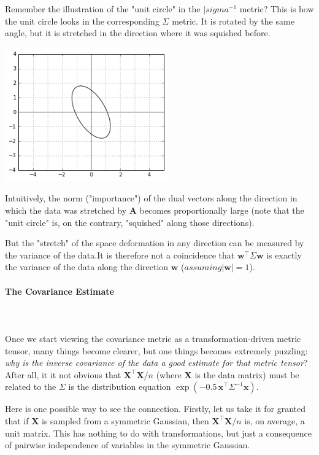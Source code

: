 \documentclass{article}
\begin{document}
Remember the illustration of the "unit circle" in the $|sigma^{-1}$ metric? This is how the unit circle looks in the corresponding $\Sigma$ metric. It is rotated by the same angle, but it is stretched in the direction where it was squished before.

\begin{center}
\includegraphics[width=7cm]{figs_hints_9.png}
\end{center}

Intuitively, the norm ("importance") of the dual vectors along the direction in which the data was stretched by $\bm{A}$ becomes proportionally large (note that the "unit circle" is, on the contrary, "squished" along those directions).\medskip

But the "stretch" of the space deformation in any direction can be measured by the variance of the data.It is therefore not a coincidence that $\bm{w}^{\intercal}\Sigma\bm{w}$ is exactly the variance of the data along the direction $\bm{w}$ ($assuming |\bm{w}| = 1$).

\paragraph{The Covariance Estimate}\mbox{}\\\\
Once we start viewing the covariance metric as a transformation-driven metric tensor, many things become clearer, but one things becomes extremely puzzling: \textit{why is the inverse covariance of the data a good estimate for that metric tensor}? After all, it it not obvious that $\bm{X}^{\intercal}\bm{X}/n$  (where $\bm{X}$ is the data matrix) must be related to the $\Sigma$ is the distribution equation $\exp\left(-0.5\,\bm{x}^{\intercal}\Sigma^{-1}\bm{x}\right)$.\medskip

Here is one possible way to see the connection. Firstly, let us take it for granted that if $\bm{X}$ is sampled from a symmetric Gaussian, then $\bm{X}^{\intercal}\bm{X}/n$ is, on average, a unit matrix. This has nothing to do with transformations, but just a consequence of pairwise independence of variables in the symmetric Gaussian.\medskip
\end{document}
